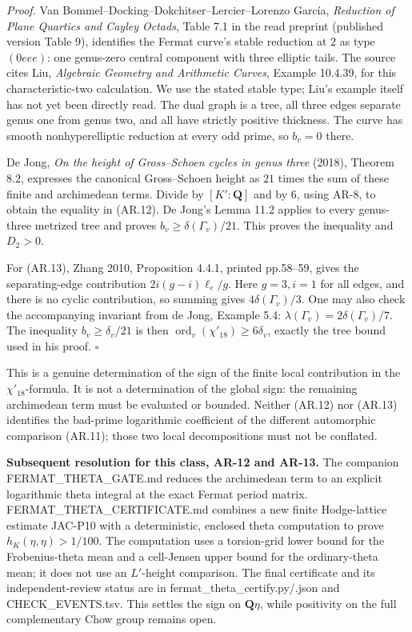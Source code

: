 \emph{Proof.} Van Bommel--Docking--Dokchitser--Lercier--Lorenzo García,
\emph{Reduction of Plane Quartics and Cayley Octads}, Table 7.1 in the
read preprint (published version Table 9), identifies the Fermat curve's
stable reduction at \(2\) as type \((0eee)\): one genus-zero central
component with three elliptic tails. The source cites Liu,
\emph{Algebraic Geometry and Arithmetic Curves}, Example 10.4.39, for
this characteristic-two calculation. We use the stated stable type;
Liu's example itself has not yet been directly read. The dual graph is a
tree, all three edges separate genus one from genus two, and all have
strictly positive thickness. The curve has smooth nonhyperelliptic
reduction at every odd prime, so \(b_v=0\) there.

De Jong, \emph{On the height of Gross--Schoen cycles in genus three}
(2018), Theorem 8.2, expresses the canonical Gross--Schoen height as
\(21\) times the sum of these finite and archimedean terms. Divide by
\([K':\mathbf Q]\) and by \(6\), using AR-8, to obtain the equality in
(AR.12). De Jong's Lemma 11.2 applies to every genus-three metrized tree
and proves \(b_v\ge\delta(\Gamma_v)/21\). This proves the inequality and
\(D_2>0\).

For (AR.13), Zhang 2010, Proposition 4.4.1, printed pp.58--59, gives the
separating-edge contribution \(2i(g-i)\ell_e/g\). Here \(g=3,i=1\) for
all edges, and there is no cyclic contribution, so summing gives
\(4\delta(\Gamma_v)/3\). One may also check the accompanying invariant
from de Jong, Example 5.4: \(\lambda(\Gamma_v)=2\delta(\Gamma_v)/7\).
The inequality \(b_v\ge\delta_v/21\) is then
\(\operatorname{ord}_v(\chi'_{18})\ge6\delta_v\), exactly the tree bound
used in his proof. \(\square\)

This is a genuine determination of the sign of the finite local
contribution in the \(\chi'_{18}\)-formula. It is not a determination of
the global sign: the remaining archimedean term must be evaluated or
bounded. Neither (AR.12) nor (AR.13) identifies the bad-prime
logarithmic coefficient of the different automorphic comparison (AR.11);
those two local decompositions must not be conflated.

\textbf{Subsequent resolution for this class, AR-12 and AR-13.} The
companion FERMAT\_THETA\_GATE.md reduces the archimedean term to an
explicit logarithmic theta integral at the exact Fermat period matrix.
FERMAT\_THETA\_CERTIFICATE.md combines a new finite Hodge-lattice
estimate JAC-P10 with a deterministic, enclosed theta computation to
prove \(h_K(\eta,\eta)>1/100\). The computation uses a torsion-grid
lower bound for the Frobenius-theta mean and a cell-Jensen upper bound
for the ordinary-theta mean; it does not use an \(L'\)-height
comparison. The final certificate and its independent-review status are
in fermat\_theta\_certify.py/.json and CHECK\_EVENTS.tsv. This settles
the sign on \(\mathbf Q\eta\), while positivity on the full
complementary Chow group remains open.

